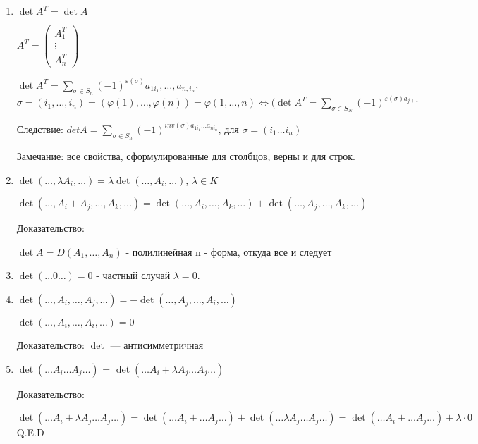 \begin{enumerate}
    \item \(\det A^T = \det A\)

          \(A^T = \begin{pmatrix}
              A_1^T  \\
              \vdots \\
              A_n^T
          \end{pmatrix}\)

          \(\det A^T = \sum\limits_{\sigma \in S_n} (-1) ^{\varepsilon(\sigma)} a_{1 i_1}, \ldots, a_{n,i_n}\), \(\sigma = (i_1, \ldots, i_n) = (\varphi(1), \ldots, \varphi(n)) = \varphi(1, \ldots, n) \Leftrightarrow (\det A^T = \sum\limits_{\sigma \in S_N} (-1) ^{\varepsilon(\sigma) a_{j+1}}\)

          Следствие: \(det A = \sum\limits_{\sigma \in S_n}(-1)^{inv (\sigma)a_{1i_1}\ldots a_{ni_n}}\), для \(\sigma = (i_1\ldots i_n)\)

          Замечание: все свойства, сформулированные для столбцов, верны и для строк.

    \item \(\det(\ldots, \lambda A_i, \ldots) = \lambda \det(\ldots, A_i, \ldots)\), \(\lambda \in K\)

          \(\det(\ldots, A_i + A_j, \ldots, A_k, \ldots) = \det(\ldots, A_i, \ldots, A_k, \ldots) + \det(\ldots, A_j, \ldots, A_k, \ldots)\)

          Доказательство:

          \(\det A  = D(A_1,\ldots, A_n) \) - полилинейная n - форма, откуда все и следует

    \item \(\det ( \ldots0\ldots) = 0 \) - частный случай $\lambda =0$.

    \item \(\det(\ldots, A_i, \ldots, A_j, \ldots) = -\det(\ldots, A_j, \ldots, A_i, \ldots)\)

          \(\det(\ldots, A_i, \ldots, A_i, \ldots) = 0\)

          Доказательство:
          \(\det\) --- антисимметричная

    \item \(\det (\ldots A_i\ldots A_j\ldots)\) = \(\det (\ldots A_i + \lambda A_j\ldots A_j\ldots)\)

          Доказательство:

          \(\det (\ldots A_i + \lambda A_j\ldots A_j\ldots) = \det (\ldots A_i + \ldots A_j\ldots)  + \det (\ldots \lambda A_j\ldots A_j\ldots) = \det (\ldots A_i + \ldots A_j\ldots) + \lambda\cdot 0\) Q.E.D



\end{enumerate}
